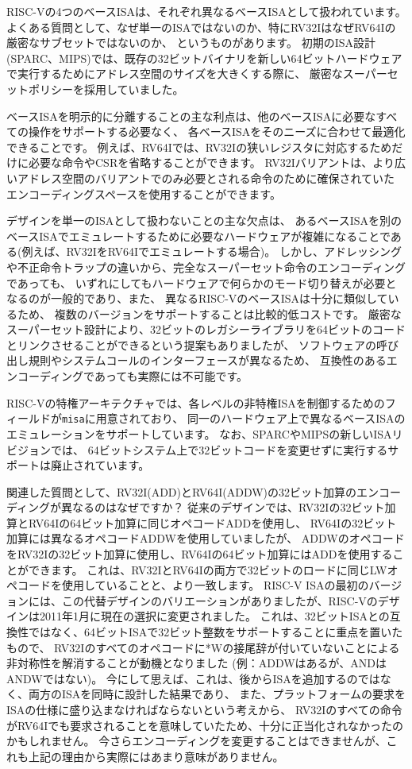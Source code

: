 \begin{commentary}
RISC-Vの4つのベースISAは、それぞれ異なるベースISAとして扱われています。
よくある質問として、なぜ単一のISAではないのか、特にRV32IはなぜRV64Iの厳密なサブセットではないのか、
というものがあります。 
初期のISA設計(SPARC、MIPS)では、既存の32ビットバイナリを新しい64ビットハードウェアで実行するためにアドレス空間のサイズを大きくする際に、
厳密なスーパーセットポリシーを採用していました。

ベースISAを明示的に分離することの主な利点は、他のベースISAに必要なすべての操作をサポートする必要なく、
各ベースISAをそのニーズに合わせて最適化できることです。
例えば、RV64Iでは、RV32Iの狭いレジスタに対応するためだけに必要な命令やCSRを省略することができます。
RV32Iバリアントは、より広いアドレス空間のバリアントでのみ必要とされる命令のために確保されていた
エンコーディングスペースを使用することができます。

デザインを単一のISAとして扱わないことの主な欠点は、
あるベースISAを別のベースISAでエミュレートするために必要なハードウェアが複雑になることである(例えば、RV32IをRV64Iでエミュレートする場合)。
しかし、アドレッシングや不正命令トラップの違いから、完全なスーパーセット命令のエンコーディングであっても、
いずれにしてもハードウェアで何らかのモード切り替えが必要となるのが一般的であり、また、
異なるRISC-VのベースISAは十分に類似しているため、
複数のバージョンをサポートすることは比較的低コストです。
厳密なスーパーセット設計により、32ビットのレガシーライブラリを64ビットのコードとリンクさせることができるという提案もありましたが、
ソフトウェアの呼び出し規則やシステムコールのインターフェースが異なるため、
互換性のあるエンコーディングであっても実際には不可能です。

RISC-Vの特権アーキテクチャでは、各レベルの非特権ISAを制御するためのフィールドが{\tt misa}に用意されており、
同一のハードウェア上で異なるベースISAのエミュレーションをサポートしています。 
なお、SPARCやMIPSの新しいISAリビジョンでは、
64ビットシステム上で32ビットコードを変更せずに実行するサポートは廃止されています。

関連した質問として、RV32I(ADD)とRV64I(ADDW)の32ビット加算のエンコーディングが異なるのはなぜですか？
従来のデザインでは、RV32Iの32ビット加算とRV64Iの64ビット加算に同じオペコードADDを使用し、
RV64Iの32ビット加算には異なるオペコードADDWを使用していましたが、
ADDWのオペコードをRV32Iの32ビット加算に使用し、RV64Iの64ビット加算にはADDを使用することができます。
これは、RV32IとRV64Iの両方で32ビットのロードに同じLWオペコードを使用していることと、より一致します。
RISC-V ISAの最初のバージョンには、この代替デザインのバリエーションがありましたが、RISC-Vのデザインは2011年1月に現在の選択に変更されました。
これは、32ビットISAとの互換性ではなく、64ビットISAで32ビット整数をサポートすることに重点を置いたもので、
RV32Iのすべてのオペコードに*Wの接尾辞が付いていないことによる非対称性を解消することが動機となりました
(例：ADDWはあるが、ANDはANDWではない)。 
今にして思えば、これは、後からISAを追加するのではなく、両方のISAを同時に設計した結果であり、
また、プラットフォームの要求をISAの仕様に盛り込まなければならないという考えから、
RV32Iのすべての命令がRV64Iでも要求されることを意味していたため、十分に正当化されなかったのかもしれません。
今さらエンコーディングを変更することはできませんが、これも上記の理由から実際にはあまり意味がありません。


\end{commentary}
